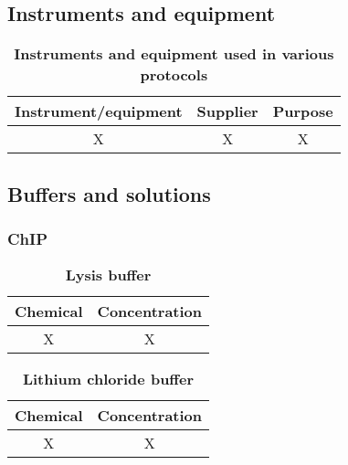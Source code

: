 \documentclass[11pt,twoside,a4paper]{report}
\begin{document}
    		\subsection{Instruments and equipment}
			\begin{table}[!ht]
       		\caption{
            		\bf{Instruments and equipment used in various protocols}
        }
        		\begin{center}
            		\begin{tabular}{|c|c|c|}
                		\hline
	                Instrument/equipment & Supplier & Purpose\\
    		            \hline
					X & X & X\\
	                \hline
	            \end{tabular}
    		    \end{center}
		    \end{table}
		    
		\subsection{Buffers and solutions}
			\subsubsection{ChIP}
				\begin{table}[!ht]
       			\caption{
            			\bf{Lysis buffer}
            		}
	        		\begin{center}
    		        		\begin{tabular}{|c|c|}
        		        		\hline
	        		        Chemical & Concentration\\
    		        		    \hline
						X & X\\
		                \hline
		            \end{tabular}
    			    \end{center}
			    \end{table}
			    
			    \begin{table}[!ht]
       			\caption{
            			\bf{Lithium chloride buffer}
            		}
	        		\begin{center}
    		        		\begin{tabular}{|c|c|}
        		        		\hline
	        		        Chemical & Concentration\\
    		        		    \hline
						X & X\\
		                \hline
		            \end{tabular}
    			    \end{center}
			    \end{table}
			    
\end{document}

